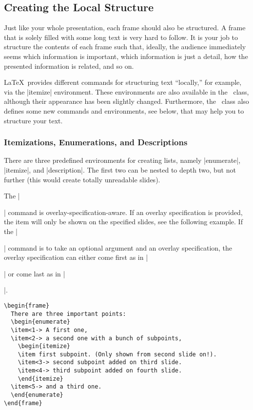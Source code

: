 \subsection{Creating the Local Structure}

Just like your whole presentation, each frame should also be
structured. A frame that is solely filled with some long text is very
hard to follow. It is your job to structure the contents of each frame
such that, ideally, the audience immediately seems which information
is important, which information is just a detail, how the presented
information is related, and so on.

\LaTeX\ provides different commands for structuring text ``locally,''
for example, via the |itemize| environment. These environments
are also available in the \beamer\ class, although their appearance has
been slightly changed. Furthermore, the \beamer\ class also defines
some new commands and environments, see below, that may help you to
structure your text.


\subsubsection{Itemizations, Enumerations, and Descriptions}

\label{section-enumerate}

There are three predefined environments for creating lists, namely
|enumerate|, |itemize|, and |description|. The first
two can be nested to depth two, but not further (this would
create totally unreadable slides).

The |\item| command is overlay-specification-aware. If an overlay
specification is provided, the item will only be shown on the
specified slides, see the following example. If the |\item|
command is to take an optional argument and an overlay specification,
the overlay specification can either come first as in |\item<1>[Cat]|
or come last as in |\item[Cat]<1>|.

\begin{verbatim}
\begin{frame}
  There are three important points:
  \begin{enumerate}
  \item<1-> A first one,
  \item<2-> a second one with a bunch of subpoints,
    \begin{itemize}
    \item first subpoint. (Only shown from second slide on!).
    \item<3-> second subpoint added on third slide.
    \item<4-> third subpoint added on fourth slide.
    \end{itemize}
  \item<5-> and a third one.
  \end{enumerate}
\end{frame}
\end{verbatim}



